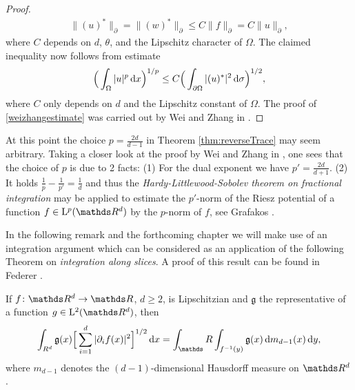 \begin{proof}
\begin{align*}
    \| (u)^* \|_\partial = \| (w)^* \|_\partial \leq C \| f\|_\partial = C \|u\|_\partial,
  \end{align*}
  where $C$ depends on $d$, $\theta$, and the Lipschitz character of $\Omega$.
  The claimed inequality now follows from estimate
  \begin{align}
    \label{weizhangestimate}
    \Big( \int_\Omega |u|^p \, {\operatorname{d}\!{x}} \Big)^{1/p} \leq C \Big( \int_{\partial\Omega} |(u)^*|^2 \, {\operatorname{d}\!{\sigma}} \Big)^{1/2},
  \end{align}
  where $C$ only depends on $d$ and the Lipschitz constant of $\Omega$.
  The proof of \eqref{weizhangestimate} was carried out by Wei and Zhang in \cite[Lem. 3.3]{weiZhang}.
\end{proof}

\begin{rem}
  At this point the choice $p = \frac{2d}{d - 1}$ in Theorem \ref{thm:reverseTrace} may seem arbitrary.
  Taking a closer look at the proof by Wei and Zhang in \cite[Lem. 3.3]{weiZhang}, one sees that the choice of $p$ is due to 2 facts: (1) For the dual exponent we have $p' = \frac{2d}{d + 1}$. (2) It holds $\frac{1}{p} - \frac{1}{p'} = \frac{1}{d}$ and thus the \emph{Hardy-Littlewood-Sobolev theorem on fractional integration} may be applied to estimate the $p'$-norm of the Riesz potential of a function $f \in \Ell^p(\R^d)$ by the $p$-norm of $f$, see Grafakos \cite[Thm 6.1.3]{grafakos2009modern}.
\end{rem}

In the following remark and the forthcoming chapter we will make use of an integration argument which can be considered as an application of the following Theorem on \emph{integration along slices}. A proof of this result can be found in Federer \cite[Thm. 3.2.12]{federer}.

\begin{thm}
  \label{thm:coarea}
  If $f \colon \R^d \to \R$, $d \geq 2$, is Lipschitzian and $\mathfrak{g}$ the representative of a function $g \in \Ell^2(\R^d)$, then
  \begin{align}
    \label{eq:coarea}
    \int_{R^d} \mathfrak{g}(x) \Big[ \sum_{i = 1}^d |\partial_i f(x)|^2 \Big]^{1/2} \d x = \int_\R \int_{f^{-1}(y)} \mathfrak{g}(x) \d m_{d - 1}(x) \d y,
  \end{align}
  where $m_{d - 1}$ denotes the $(d - 1)$-dimensional Hausdorff measure on $\R^d$.
\end{thm}

